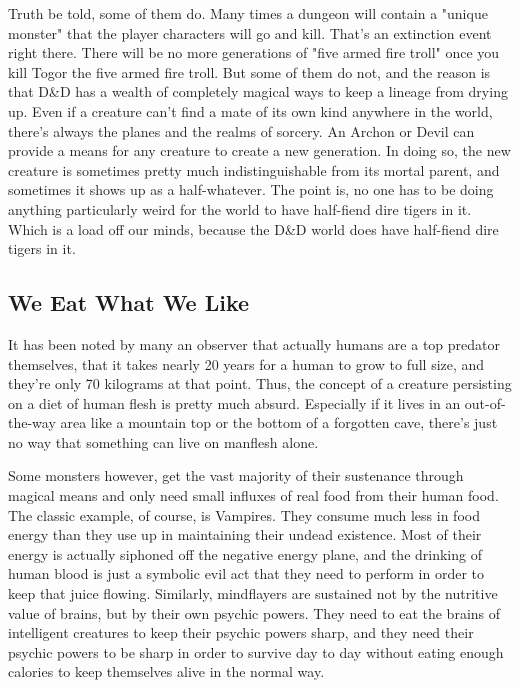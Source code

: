 Truth be told, some of them do. Many times a dungeon will contain a "unique monster" that the player characters will go and kill. That's an extinction event right there. There will be no more generations of "five armed fire troll" once you kill Togor the five armed fire troll. But some of them do not, and the reason is that D\&D has a wealth of completely magical ways to keep a lineage from drying up. Even if a creature can't find a mate of its own kind anywhere in the world, there's always the planes and the realms of sorcery. An Archon or Devil can provide a means for any creature to create a new generation. In doing so, the new creature is sometimes pretty much indistinguishable from its mortal parent, and sometimes it shows up as a half-whatever. The point is, no one has to be doing anything particularly weird for the world to have half-fiend dire tigers in it. Which is a load off our minds, because the D\&D world does have half-fiend dire tigers in it.

\subsection{We Eat What We Like}

It has been noted by many an observer that actually humans are a top predator themselves, that it takes nearly 20 years for a human to grow to full size, and they're only 70 kilograms at that point. Thus, the concept of a creature persisting on a diet of human flesh is pretty much absurd. Especially if it lives in an out-of-the-way area like a mountain top or the bottom of a forgotten cave, there's just no way that something can live on manflesh alone.

Some monsters however, get the vast majority of their sustenance through magical means and only need small influxes of real food from their human food. The classic example, of course, is Vampires. They consume much less in food energy than they use up in maintaining their undead existence. Most of their energy is actually siphoned off the negative energy plane, and the drinking of human blood is just a symbolic evil act that they need to perform in order to keep that juice flowing. Similarly, mindflayers are sustained not by the nutritive value of brains, but by their own psychic powers. They need to eat the brains of intelligent creatures to keep their psychic powers sharp, and they need their psychic powers to be sharp in order to survive day to day without eating enough calories to keep themselves alive in the normal way.

